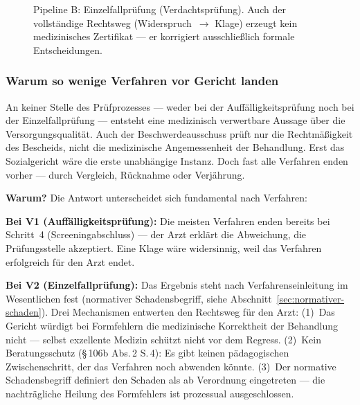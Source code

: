\documentclass{umbruch-position}
\begin{document}
\begin{figure}[p]
{%
}
\caption{Pipeline B: Einzelfallprüfung (Verdachtsprüfung). Auch der vollständige Rechtsweg (Widerspruch~$\to$ Klage) erzeugt kein medizinisches Zertifikat --- er korrigiert ausschließlich formale Entscheidungen.}
\label{fig:pipeline-einzel}
\end{figure}

\subsubsection{Warum so wenige Verfahren vor Gericht landen}

An keiner Stelle des Prüfprozesses --- weder bei der Auffälligkeitsprüfung noch bei der Einzelfallprüfung --- entsteht eine medizinisch verwertbare Aussage über die Versorgungsqualität. Auch der Beschwerdeausschuss prüft nur die Rechtmäßigkeit des Bescheids, nicht die medizinische Angemessenheit der Behandlung. Erst das Sozialgericht wäre die erste unabhängige Instanz. Doch fast alle Verfahren enden vorher --- durch Vergleich, Rücknahme oder Verjährung.

\textbf{Warum?} Die Antwort unterscheidet sich fundamental nach Verfahren:

\textbf{Bei V1 (Auffälligkeitsprüfung):} Die meisten Verfahren enden bereits bei Schritt~4 (Screening\-abschluss) --- der Arzt erklärt die Abweichung, die Prüfungsstelle akzeptiert. Eine Klage wäre widersinnig, weil das Verfahren erfolgreich für den Arzt endet.

\textbf{Bei V2 (Einzelfallprüfung):} Das Ergebnis steht nach Verfahrenseinleitung im Wesentlichen fest (normativer Schadensbegriff, siehe Abschnitt~\ref{sec:normativer-schaden}). Drei Mechanismen entwerten den Rechtsweg für den Arzt: (1)~Das Gericht würdigt bei Formfehlern die medizinische Korrektheit der Behandlung nicht --- selbst exzellente Medizin schützt nicht vor dem Regress. (2)~Kein Beratungsschutz (\S\,106b Abs.\,2 S.\,4): Es gibt keinen pädagogischen Zwischenschritt, der das Verfahren noch abwenden könnte. (3)~Der normative Schadensbegriff definiert den Schaden als ab Verordnung eingetreten --- die nachträgliche Heilung des Formfehlers ist prozessual ausgeschlossen.
\end{document}
